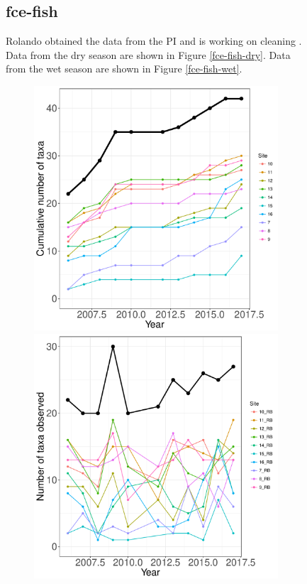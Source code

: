 \documentclass[11pt, oneside]{article}
\begin{document}
\begin{figure}[h!]
\subsection {fce-fish}
Rolando obtained the data from the PI and is working on cleaning \citep{fce-fish}.
Data from the dry season are shown in Figure \ref{fce-fish-dry}.
Data from the wet season are shown in Figure \ref{fce-fish-wet}.

\begin{figure}[h!]
\centering
\includegraphics[scale = 0.4]{fce-fish-RehageDry_species_accumulation_curve.pdf}
\includegraphics[scale = 0.4]{fce-fish-RehageDry_num_taxa_over_time.pdf}

\end{figure}
\end{figure}
\end{document}
